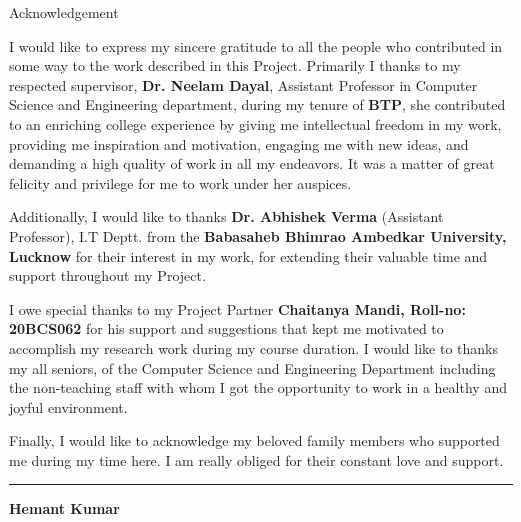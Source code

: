 \documentclass[12pt,letterpaper]{article}
\begin{document}
\newpage
    \begin{center}
        \vspace*{1cm}
        {\englishtowne \LARGE Acknowledgement}
        
        \vspace{1.2cm}
        
       \large I would like to express my sincere gratitude to all the people who contributed in some way to the work described in this Project. Primarily I thanks to my respected supervisor, \textbf{Dr. Neelam Dayal}, Assistant Professor in Computer Science and Engineering department, during my tenure of \textbf{BTP}, she contributed to an enriching college experience by giving me intellectual freedom in my work, providing me inspiration and motivation, engaging me with new ideas, and demanding a high quality of work in all my endeavors. It was a matter of great felicity and privilege for me to work under her auspices. 
       
       Additionally, I would like to thanks \textbf{Dr. Abhishek Verma} (Assistant Professor), I.T Deptt. from the \textbf{Babasaheb Bhimrao Ambedkar University, Lucknow} for their interest in my work, for extending their valuable time and support throughout my Project.

       I owe special thanks to my Project Partner \textbf{Chaitanya Mandi, Roll-no: 20BCS062} for his support and suggestions that kept me motivated to accomplish my research work during my course duration.  I would like to thanks my all seniors, of the Computer Science and Engineering Department including the non-teaching staff with whom I got the opportunity to work in a healthy and joyful environment.

       Finally, I would like to acknowledge my beloved family members who supported me during my time here. I am really obliged for their constant love and support.
        
        \vfill %
        
        \hrule %
        
        \vspace{1cm} %
        
    \hfill \textbf{Hemant Kumar}
        
        
        
    \end{center}
    
\end{document}
